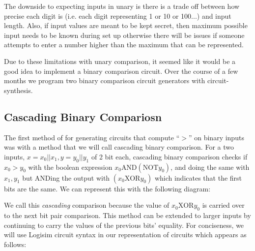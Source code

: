 \documentclass[12pt,twoside]{reedthesis}
\begin{document}
   The downside to expecting inputs in unary is there is a trade off between how precise each digit is (i.e. each digit representing 1 or 10 or 100...) and input length. Also, if input values are meant to be kept secret, then maximum possible input needs to be known during set up otherwise there will be issues if someone attempts to enter a number higher than the maximum that can be represented.
   \par Due to these limitations with unary comparison, it seemed like it would be a good idea to implement a binary comparison circuit.  Over the course of a few months we program two binary comparison circuit generators with circuit-synthesis.
   
   \subsection{Cascading Binary Compariosn}
   \newcommand{\AND}[0]{\text{AND}}
   \newcommand{\OR}[0]{\text{OR}}
   \newcommand{\NOT}[0]{\text{NOT}}
   \newcommand{\XOR}[0]{\text{XOR}}
   
   The first method of for generating circuits that compute ``$>$'' on binary inputs was with a method that we will call cascading binary comparison. For a two inputs, $x = x_0||x_1,y= y_0||y_1$ of 2 bit each, cascading binary comparison checks if $x_0 > y_0$ with the boolean expression $x_0 \AND (\NOT y_0)$, and doing the same with $x_1,y_1$ but ANDing the output with $(x_0 \XOR y_0)$ which indicates that the first bits are the same. We can represent this with the following diagram:
   
   \begin{center}
\end{center}
   
   We call this \textit{cascading} comparison because the value of $x_0 \XOR y_0$ is carried over to the next bit pair comparison. This method can be extended to larger inputs by continuing to carry the values of the previous bits' equality. For conciseness, we will use Logisim circuit syntax in our representation of circuits which appears as follows:
   
\end{document}
